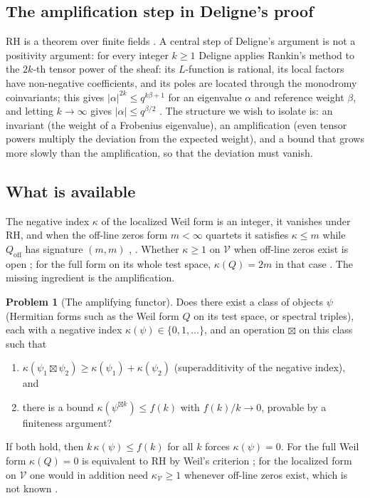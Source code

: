 \documentclass[11pt]{amsart}
\theoremstyle{definition}
\newtheorem{problem}[theorem]{Problem}
\theoremstyle{remark}
\begin{document}
\subsection{The amplification step in Deligne's proof}
RH is a theorem over finite fields \cite{Del74}. A central step of Deligne's argument is not a
positivity argument: for every integer $k\ge1$ Deligne applies Rankin's method to the $2k$-th
tensor power of the sheaf: its $L$-function is rational, its local factors have non-negative
coefficients, and its poles are located through the monodromy coinvariants; this gives
$|\alpha|^{2k}\le q^{k\beta+1}$ for an eigenvalue $\alpha$ and reference weight $\beta$, and
letting $k\to\infty$ gives $|\alpha|\le q^{\beta/2}$ \cite[\S3]{Del74}. The structure we wish to
isolate is: an invariant (the weight of a Frobenius eigenvalue), an amplification (even tensor
powers multiply the
deviation from the expected weight), and a bound that grows more slowly than the amplification,
so that the deviation must vanish.

\subsection{What is available}
The negative index $\kappa$ of the localized Weil form is an integer, it vanishes under RH, and
when the off-line zeros form $m<\infty$ quartets it satisfies $\kappa\le m$ while
$Q_{\mathrm{off}}$ has signature $(m,m)$ \cite[Prop.~2.5]{P25}, \cite[Thm.~3.1, Cor.~6.5]{P18}.
Whether $\kappa\ge1$ on $\mathcal V$ when off-line zeros exist is open \cite{P25}; for the full
form on its whole test space, $\kappa(Q)=2m$ in that case \cite[Prop.~4.7]{P25}. The missing ingredient is the
amplification.

\begin{problem}[The amplifying functor]\label{prob:amplify}
Does there exist a class of objects $\psi$ (Hermitian forms such as the Weil form $Q$ on its
test space, or spectral triples), each with a negative index $\kappa(\psi)\in\{0,1,\dots\}$, and
an operation $\boxtimes$ on this class such that
\begin{enumerate}[\rm(a)]
\item $\kappa(\psi_1\boxtimes\psi_2)\geq\kappa(\psi_1)+\kappa(\psi_2)$
(superadditivity of the negative index), and
\item there is a bound $\kappa(\psi^{\boxtimes k})\leq f(k)$ with
$f(k)/k\to0$, provable by a finiteness argument?
\end{enumerate}
If both hold, then $k\,\kappa(\psi)\leq f(k)$ for all $k$ forces $\kappa(\psi)=0$. For the full
Weil form $\kappa(Q)=0$ is equivalent to RH by Weil's criterion \cite[Def.~2.3]{P25}; for the
localized form on $\mathcal V$ one would in addition need $\kappa_{\mathcal V}\ge1$ whenever
off-line zeros exist, which is not known \cite[Cor.~6.5]{P18}.
\end{problem}
\end{document}
